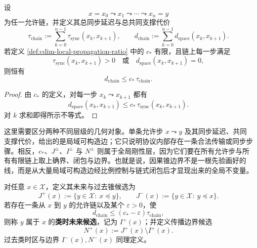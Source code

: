 \begin{proposition}[链式传播上界]\label{prop:cdim-chainwise-propagation-bound}
设
\[
x=x_0\leadsto x_1\leadsto\cdots\leadsto x_n=y
\]
为任一允许链，并定义其总同步延迟与总共同支撑代价
\[
\tau_{\mathrm{chain}}
:=
\sum_{k=0}^{n-1}\tau_{\mathrm{sync}}(x_k,x_{k+1}),
\qquad
d_{\mathrm{chain}}
:=
\sum_{k=0}^{n-1}d_{\mathrm{space}}(x_k,x_{k+1}).
\]
若定义 \ref{def:cdim-local-propagation-ratio} 中的 \(c_*\) 有限，且链上每一步满足
\[
\tau_{\mathrm{sync}}(x_k,x_{k+1})>0
\quad\text{或}\quad
d_{\mathrm{space}}(x_k,x_{k+1})=0,
\]
则恒有
\[
d_{\mathrm{chain}}\le c_*\,\tau_{\mathrm{chain}}.
\]
\end{proposition}
\begin{proof}
由 \(c_*\) 的定义，对每一步 \(x_k\leadsto x_{k+1}\) 都有
\[
d_{\mathrm{space}}(x_k,x_{k+1})
\le
c_*\,\tau_{\mathrm{sync}}(x_k,x_{k+1}).
\]
对 \(k\) 求和即得所示不等式。
\end{proof}

\begin{remark}[局域可构造边与全局锥边界的分层]\label{rem:cdim-local-edge-vs-global-cone-layering}
这里需要区分两种不同层级的几何对象。单条允许步 \(x\leadsto y\) 及其同步延迟、共同支撑代价，给出的是局域可构造边；它只说明协议内部存在一条合法传输或同步步骤。相反，\(c_*\)、\(J^\pm\)、\(I^\pm\) 与 \(N^\pm\) 则属于全局刚性层，因为它们要在所有允许步与所有有限链上取上确界、闭包与边界。也就是说，因果锥边界不是一根先验画好的线，而是从大量局域可构造边经比例控制与链式闭包后才显现出来的全局不变量。
\end{remark}

\begin{definition}\label{def:cdim-causal-cone-candidates}
对任意 \(x\in\mathcal X\)，定义其未来与过去锥候选为
\[
J^+(x):=\{y\in\mathcal X:\ x\preceq y\},
\qquad
J^-(x):=\{y\in\mathcal X:\ y\preceq x\}.
\]
若存在一条从 \(x\) 到 \(y\) 的允许链以及某个 \(\varepsilon>0\)，使
\[
d_{\mathrm{chain}}
\le
(c_*-\varepsilon)\tau_{\mathrm{chain}},
\]
则称 \(y\) 属于 \(x\) 的\textbf{类时未来候选}，记为 \(I^+(x)\)；并定义传播边界候选
\[
N^+(x):=J^+(x)\setminus I^+(x).
\]
过去类时区与边界 \(I^-(x),N^-(x)\) 同理定义。
\end{definition}

